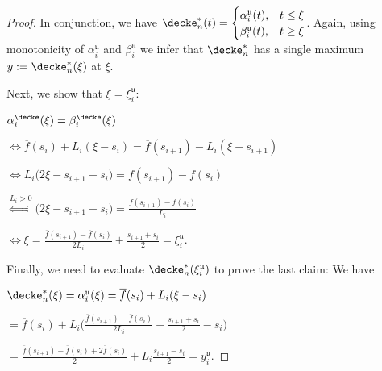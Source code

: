 \begin{lem}
\begin{proof}
In conjunction, we have 
 $\decke^*_n(t) = 
 \begin{cases}  
 \alpha_i^{\mathfrak u} (t), & t \leq \xi \\
 \beta_i^{\mathfrak u} (t), & t \geq \xi 
 \end{cases}$.
 Again, using monotonicity of $\alpha_i^{\mathfrak u}$ and $\beta_i^{\mathfrak u}$ we infer that $\decke^*_n$ has a single maximum $y := \decke^*_n(\xi)$ at $\xi$.

Next, we show that $\xi = \xi_i^{\mathfrak u}$: 

$\alpha^\decke_i(\xi) = \beta^\decke_i(\xi)$

$\Leftrightarrow  \overline f(s_i) + L_i (\xi - s_i) = \overline f(s_{i+1}) -L_i (\xi - s_{i+1})$

$\Leftrightarrow  L_i \bigl( 2 \xi - s_{i+1}  - s_i\bigr) = \overline f(s_{i+1}) - \overline f(s_i) $

$\stackrel{L_i > 0}{\Leftrightarrow}   \bigl( 2 \xi - s_{i+1}  - s_i\bigr) = \frac{\overline f(s_{i+1}) - \overline f(s_i)}{L_i} $

$\Leftrightarrow   \xi  = \frac{\overline f(s_{i+1}) - \overline f(s_i)}{2 L_i}  + \frac{s_{i+1}+s_i}{2} = \xi^{\mathfrak u}_i$.



Finally, we need to evaluate $\decke^*_n(\xi^{\mathfrak u}_i)$ to prove the last claim:
We have 

 $\decke^*_n(\xi) = \alpha_i^{\mathfrak u} (\xi) =  \overline f(s_i) + L_i (\xi - s_i) $

$= \overline f(s_i) + L_i \bigl( \frac{\overline f(s_{i+1}) - \overline f(s_i)}{2 L_i}  + \frac{s_{i+1}+s_i}{2} - s_i \bigr) $ 

$=  \frac{\overline f(s_{i+1}) - \overline f(s_i) + 2\overline f(s_i)}{2 }  + L_i \frac{s_{i+1}-s_i}{2}   = y_i^{\mathfrak u}$. 



\end{proof}

\end{lem}


